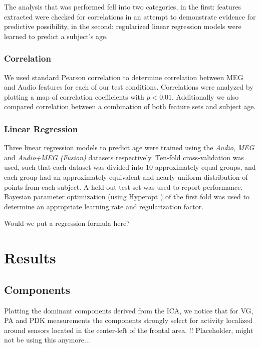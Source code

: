\documentclass[a4paper]{article}
\begin{document}
The analysis that was performed fell into two categories, in the first: features extracted were checked for correlations in an attempt to demonstrate evidence for predictive possibility, in the second: regularized linear regression models were learned to predict a subject's age.

\subsubsection{Correlation}

We used standard Pearson correlation to determine correlation between MEG and Audio features for each of our test conditions. Correlations were analyzed by plotting a map of correlation coefficients with $p < 0.01$. Additionally we also compared correlation between a combination of both feature sets and subject age.

\subsubsection{Linear Regression}

Three linear regression models to predict age were trained using the \textit{Audio}, \textit{MEG} and \textit{Audio+MEG (Fusion)} datasets respectively. Ten-fold cross-validation was used, such that each dataset was divided into 10 approximately equal groups, and each group had an approximately equivalent and nearly uniform distribution of points from each subject. A held out test set was used to report performance. Bayesian parameter optimization (using Hyperopt \cite{Bergstra2013}) of the first fold was used to determine an appropriate learning rate and regularization factor.

Would we put a regression formula here?

\section{Results}

\subsection{Components}

Plotting the dominant components derived from the ICA, we notice that for VG, PA and PDK measurements the components strongly select for activity localized around sensors located in the center-left of the frontal area. !! Placeholder, might not be using this anymore... 
\end{document}
